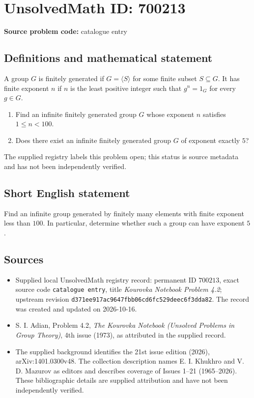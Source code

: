 \documentclass[11pt]{article}
\begin{document}
\section*{UnsolvedMath ID: 700213}
\textbf{Source problem code:} catalogue entry
\subsection{Definitions and mathematical statement}
A group \(G\) is finitely generated if \(G=\langle S\rangle\) for some finite subset \(S\subseteq G\). It has finite exponent \(n\) if \(n\) is the least positive integer such that \(g^n=1_G\) for every \(g\in G\).

\begin{enumerate}
\item[(a)] Find an infinite finitely generated group \(G\) whose exponent \(n\) satisfies \(1\leq n<100\).
\item[(b)] Does there exist an infinite finitely generated group \(G\) of exponent exactly \(5\)?
\end{enumerate}
The supplied registry labels this problem open; this status is source metadata and has not been independently verified.
\subsection{Short English statement}
Find an infinite group generated by finitely many elements with finite exponent less than \(100\). In particular, determine whether such a group can have exponent \(5\).
\subsection{Sources}
\begin{itemize}
\item Supplied local UnsolvedMath registry record: permanent ID \(700213\), exact source code \texttt{catalogue entry}, title \emph{Kourovka Notebook Problem 4.2}; upstream revision \texttt{d371ee917ac9647fbb06cd6fc529deec6f3dda82}. The record was created and updated on 2026-10-16.
\item S. I. Adian, Problem 4.2, \emph{The Kourovka Notebook (Unsolved Problems in Group Theory)}, 4th issue (1973), as attributed in the supplied record.
\item The supplied background identifies the 21st issue edition (2026), arXiv:1401.0300v48. The collection description names E. I. Khukhro and V. D. Mazurov as editors and describes coverage of Issues 1--21 (1965--2026). These bibliographic details are supplied attribution and have not been independently verified.
\end{itemize}
\end{document}
